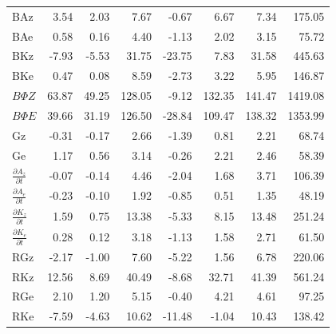 \documentclass[pdflatex,sn-chicago]{sn-jnl}%
\theoremstyle{plain}
\theoremstyle{definition}
\theoremstyle{remark}
\theoremstyle{definition}
\begin{document}
\begin{table}[!htbp]
\begin{tabular}{lrrrrrrr}
BAz & 3.54 & 2.03 & 7.67 & -0.67 & 6.67 & 7.34 & 175.05 \\
BAe & 0.58 & 0.16 & 4.40 & -1.13 & 2.02 & 3.15 & 75.72 \\
BKz & -7.93 & -5.53 & 31.75 & -23.75 & 7.83 & 31.58 & 445.63 \\
BKe & 0.47 & 0.08 & 8.59 & -2.73 & 3.22 & 5.95 & 146.87 \\
$B\Phi Z$ & 63.87 & 49.25 & 128.05 & -9.12 & 132.35 & 141.47 & 1419.08 \\
$B\Phi E$ & 39.66 & 31.19 & 126.50 & -28.84 & 109.47 & 138.32 & 1353.99 \\
Gz & -0.31 & -0.17 & 2.66 & -1.39 & 0.81 & 2.21 & 68.74 \\
Ge & 1.17 & 0.56 & 3.14 & -0.26 & 2.21 & 2.46 & 58.39 \\
$\frac{\partial A_z}{\partial t}$ & -0.07 & -0.14 & 4.46 & -2.04 & 1.68 & 3.71 & 106.39 \\
$\frac{\partial A_e}{\partial t}$ & -0.23 & -0.10 & 1.92 & -0.85 & 0.51 & 1.35 & 48.19 \\
$\frac{\partial K_z}{\partial t}$ & 1.59 & 0.75 & 13.38 & -5.33 & 8.15 & 13.48 & 251.24 \\
$\frac{\partial K_e}{\partial t}$ & 0.28 & 0.12 & 3.18 & -1.13 & 1.58 & 2.71 & 61.50 \\
RGz & -2.17 & -1.00 & 7.60 & -5.22 & 1.56 & 6.78 & 220.06 \\
RKz & 12.56 & 8.69 & 40.49 & -8.68 & 32.71 & 41.39 & 561.24 \\
RGe & 2.10 & 1.20 & 5.15 & -0.40 & 4.21 & 4.61 & 97.25 \\
RKe & -7.59 & -4.63 & 10.62 & -11.48 & -1.04 & 10.43 & 138.42 \\
\bottomrule
\end{tabular}
\end{table}
\end{document}
